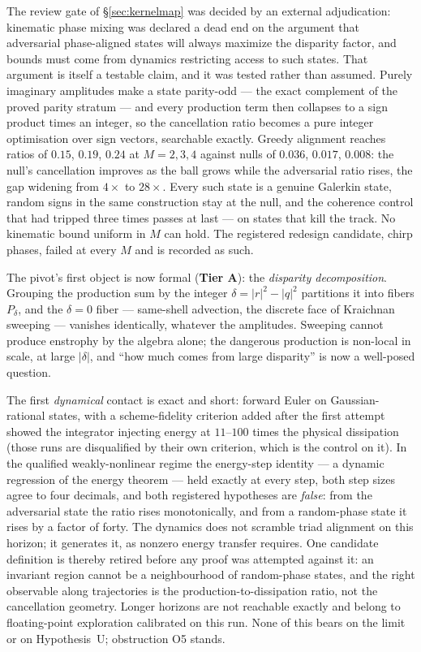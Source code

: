 \documentclass[11pt,a4paper]{article}
\newcommand{\tA}{\textcolor{TierA}{\textbf{Tier A}}}
\theoremstyle{definition}
\theoremstyle{plain}
\begin{document}
The review gate of \S\ref{sec:kernelmap} was decided by an external adjudication: kinematic
phase mixing was declared a dead end on the argument that adversarial phase-aligned states will
always maximize the disparity factor, and bounds must come from dynamics restricting access to
such states. That argument is itself a testable claim, and it was tested rather than assumed.
Purely imaginary amplitudes make a state parity-odd --- the exact complement of the proved
parity stratum --- and every production term then collapses to a sign product times an
integer, so the cancellation ratio becomes a pure integer optimisation over sign vectors,
searchable exactly. Greedy alignment reaches ratios of $0.15$, $0.19$, $0.24$ at $M=2,3,4$
against nulls of $0.036$, $0.017$, $0.008$: the null's cancellation improves as the ball grows
while the adversarial ratio rises, the gap widening from $4\times$ to $28\times$. Every such
state is a genuine Galerkin state, random signs in the same construction stay at the null, and
the coherence control that had tripped three times passes at last --- on states that kill the
track. No kinematic bound uniform in $M$ can hold. The registered redesign candidate, chirp
phases, failed at every $M$ and is recorded as such.

The pivot's first object is now formal (\tA{}): the \emph{disparity decomposition}. Grouping
the production sum by the integer $\delta=|r|^2-|q|^2$ partitions it into fibers $P_\delta$,
and the $\delta=0$ fiber --- same-shell advection, the discrete face of Kraichnan sweeping ---
vanishes identically, whatever the amplitudes. Sweeping cannot produce enstrophy by the algebra
alone; the dangerous production is non-local in scale, at large $|\delta|$, and ``how much comes
from large disparity'' is now a well-posed question.

The first \emph{dynamical} contact is exact and short: forward Euler on Gaussian-rational
states, with a scheme-fidelity criterion added after the first attempt showed the integrator
injecting energy at $11$--$100$ times the physical dissipation (those runs are disqualified by
their own criterion, which is the control on it). In the qualified weakly-nonlinear regime the
energy-step identity --- a dynamic regression of the energy theorem --- held exactly at every
step, both step sizes agree to four decimals, and both registered hypotheses are \emph{false}:
from the adversarial state the ratio rises monotonically, and from a random-phase state it rises
by a factor of forty. The dynamics does not scramble triad alignment on this horizon; it
generates it, as nonzero energy transfer requires. One candidate definition is thereby retired
before any proof was attempted against it: an invariant region cannot be a neighbourhood of
random-phase states, and the right observable along trajectories is the production-to-dissipation
ratio, not the cancellation geometry. Longer horizons are not reachable exactly and belong to
floating-point exploration calibrated on this run. None of this bears on the limit or on
Hypothesis~U; obstruction O5 stands.
\end{document}
